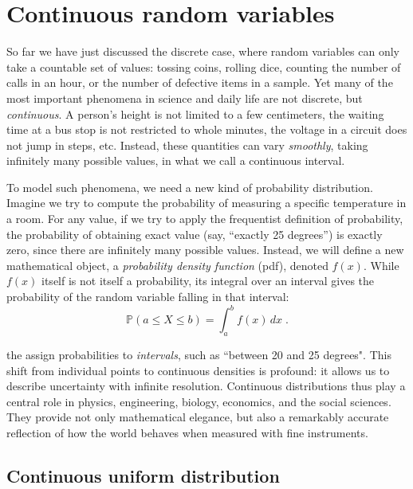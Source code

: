 \documentclass{book}
\begin{document}
\section{Continuous random variables}

So far we have just discussed the discrete case, where random variables can only take a countable set of values: tossing coins, rolling dice, counting the number of calls in an hour, or the number of defective items in a sample. Yet many of the most important phenomena in science and daily life are not discrete, but \textit{continuous}. A person’s height is not limited to a few centimeters, the waiting time at a bus stop is not restricted to whole minutes, the voltage in a circuit does not jump in steps, etc. Instead, these quantities can vary \textit{smoothly}, taking infinitely many possible values, in what we call a continuous interval.

\medskip

To model such phenomena, we need a new kind of probability distribution. Imagine we try to compute the probability of measuring a specific temperature in a room. For any value, if we try to apply the frequentist definition of probability, the probability of obtaining exact value (say, “exactly 25 degrees”) is exactly zero, since there are infinitely many possible values. Instead, we will define a new mathematical object, a \textit{probability density function} (pdf), denoted $f(x)$. While $f(x)$ itself is not itself a probability, its integral over an interval gives the probability of the random variable falling in that interval:
\begin{equation}
	\mathbb{P}(a \leq X \leq b) = \int_a^b f(x) \, dx \; .
	\label{eq:prob_continous}
\end{equation}

the assign probabilities to \textit{intervals}, such as “between 20 and 25 degrees". This shift from individual points to continuous densities is profound: it allows us to describe uncertainty with infinite resolution. Continuous distributions thus play a central role in physics, engineering, biology, economics, and the social sciences. They provide not only mathematical elegance, but also a remarkably accurate reflection of how the world behaves when measured with fine instruments.

\subsection*{Continuous uniform distribution}
\end{document}
